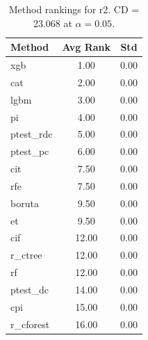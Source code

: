 \begin{table}[h]
\centering
\caption{Method rankings for r2. CD = 23.068 at $\alpha=0.05$.}
\label{tab:ranks_r2}
\begin{tabular}{lcc}
\toprule
Method & Avg Rank & Std \\
\midrule
xgb & 1.00 & 0.00 \\
cat & 2.00 & 0.00 \\
lgbm & 3.00 & 0.00 \\
pi & 4.00 & 0.00 \\
ptest_rdc & 5.00 & 0.00 \\
ptest_pc & 6.00 & 0.00 \\
cit & 7.50 & 0.00 \\
rfe & 7.50 & 0.00 \\
boruta & 9.50 & 0.00 \\
et & 9.50 & 0.00 \\
cif & 12.00 & 0.00 \\
r_ctree & 12.00 & 0.00 \\
rf & 12.00 & 0.00 \\
ptest_dc & 14.00 & 0.00 \\
cpi & 15.00 & 0.00 \\
r_cforest & 16.00 & 0.00 \\
\bottomrule
\end{tabular}
\end{table}
